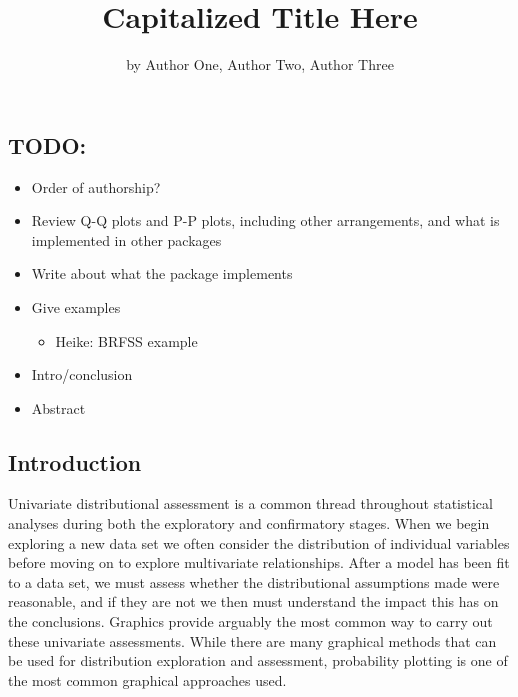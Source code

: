 \title{Capitalized Title Here}
\author{by Author One, Author Two, Author Three}

\maketitle


\subsection{TODO:}\label{todo}

\begin{itemize}
\tightlist
\item
  Order of authorship?
\item
  Review Q-Q plots and P-P plots, including other arrangements, and what
  is implemented in other packages
\item
  Write about what the package implements
\item
  Give examples

  \begin{itemize}
  \tightlist
  \item
    Heike: BRFSS example
  \end{itemize}
\item
  Intro/conclusion
\item
  Abstract
\end{itemize}

\subsection{Introduction}\label{introduction}

Univariate distributional assessment is a common thread throughout
statistical analyses during both the exploratory and confirmatory
stages. When we begin exploring a new data set we often consider the
distribution of individual variables before moving on to explore
multivariate relationships. After a model has been fit to a data set, we
must assess whether the distributional assumptions made were reasonable,
and if they are not we then must understand the impact this has on the
conclusions. Graphics provide arguably the most common way to carry out
these univariate assessments. While there are many graphical methods
that can be used for distribution exploration and assessment,
probability plotting is one of the most common graphical approaches
used.

